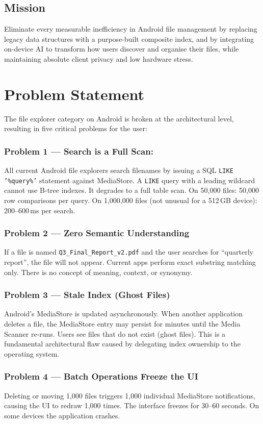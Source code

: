 \section{Mission}
Eliminate every measurable inefficiency in Android file management by replacing legacy data structures with a purpose-built composite index, and by integrating on-device AI to transform how users discover and organise their files, while maintaining absolute client privacy and low hardware stress.

\chapter{Problem Statement}

The file explorer category on Android is broken at the architectural level, resulting in five critical problems for the user:

\subsection{Problem 1 --- Search is a Full Scan: }
All current Android file explorers search filenames by issuing a SQL \texttt{LIKE '\%query\%'} statement against MediaStore. A \texttt{LIKE} query with a leading wildcard cannot use B-tree indexes. It degrades to a full table scan. On 50,000 files: 50,000 row comparisons per query. On 1,000,000 files (not unusual for a 512\,GB device): 200--600\,ms per search.

\subsection{Problem 2 --- Zero Semantic Understanding}
If a file is named \texttt{Q3\_Final\_Report\_v2.pdf} and the user searches for ``quarterly report'', the file will not appear. Current apps perform exact substring matching only. There is no concept of meaning, context, or synonymy.

\subsection{Problem 3 --- Stale Index (Ghost Files)}
Android's MediaStore is updated asynchronously. When another application deletes a file, the MediaStore entry may persist for minutes until the Media Scanner re-runs. Users see files that do not exist (ghost files). This is a fundamental architectural flaw caused by delegating index ownership to the operating system.

\subsection{Problem 4 --- Batch Operations Freeze the UI}
Deleting or moving 1,000 files triggers 1,000 individual MediaStore notifications, causing the UI to redraw 1,000 times. The interface freezes for 30--60 seconds. On some devices the application crashes.

